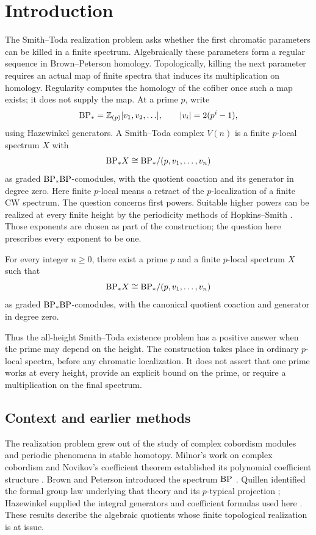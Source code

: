 \section{Introduction}
\label{sec:introduction}

The Smith--Toda realization problem asks whether the first chromatic
parameters can be killed in a finite spectrum. Algebraically these
parameters form a regular sequence in Brown--Peterson homology.
Topologically, killing the next parameter requires an actual map of
finite spectra that induces its multiplication on homology. Regularity
computes the homology of the cofiber once such a map exists; it does
not supply the map. At a prime $p$, write
\[
 \mathrm{BP}_* = \mathbb Z_{(p)}[v_1,v_2,\ldots],
 \qquad |v_i|=2(p^i-1),
\]
using Hazewinkel generators. A Smith--Toda complex $V(n)$ is a finite
$p$-local spectrum $X$ with
\[
 \mathrm{BP}_*X\cong\mathrm{BP}_*/(p,v_1,\ldots,v_n)
\]
as graded $\mathrm{BP}_*\mathrm{BP}$-comodules, with the quotient coaction and its
generator in degree zero. Here finite $p$-local means a retract of the
$p$-localization of a finite CW spectrum. The question concerns first
powers. Suitable higher powers can be realized at every finite height
by the periodicity methods of Hopkins--Smith
\cite[Theorem~9 and Proposition~5.14]{HopkinsSmith1998}. Those
exponents are chosen as part of the construction; the question here
prescribes every exponent to be one.

\begin{theorem}\label{thm:main}
For every integer $n\geq0$, there exist a prime $p$ and a finite
$p$-local spectrum $X$ such that
\[
 \mathrm{BP}_*X\cong\mathrm{BP}_*/(p,v_1,\ldots,v_n)
\]
as graded $\mathrm{BP}_*\mathrm{BP}$-comodules, with the canonical quotient coaction
and generator in degree zero.
\end{theorem}

Thus the all-height Smith--Toda existence problem has a positive answer
when the prime may depend on the height. The construction takes place
in ordinary $p$-local spectra, before any chromatic localization. It
does not assert that one prime works at every height, provide an
explicit bound on the prime, or require a multiplication on the final
spectrum.

\subsection{Context and earlier methods}
The realization problem grew out of the study of complex cobordism
modules and periodic phenomena in stable homotopy. Milnor's work on
complex cobordism and Novikov's coefficient theorem established its
polynomial coefficient structure \cite{Milnor1960,Novikov1962}.
Brown and Peterson introduced the spectrum $\mathrm{BP}$ \cite{BrownPeterson1966}.
Quillen
identified the formal group law underlying that theory and its
$p$-typical projection \cite{Quillen1969}; Hazewinkel supplied
the integral generators and coefficient formulas used here
\cite{HazewinkelIII}. These results describe the algebraic quotients
whose finite topological realization is at issue.

